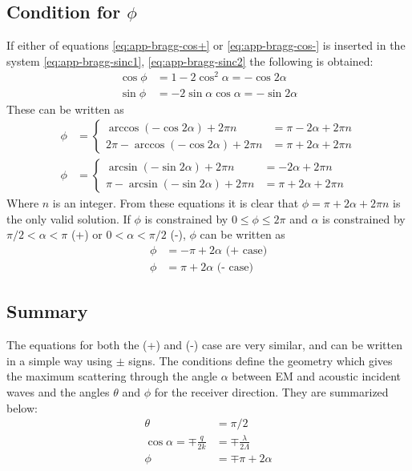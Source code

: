 \documentclass[11pt,twoside]{eitExjobb}
\begin{document}
	\subsection{Condition for $\phi$}
	If either of equations \eqref{eq:app-bragg-cos+} or \eqref{eq:app-bragg-cos-} is inserted in the system \eqref{eq:app-bragg-sinc1}, \eqref{eq:app-bragg-sinc2} the following is obtained:
	\begin{align*}
		\cos{\phi} &= 1 - 2\cos^2{\alpha} = -\cos{2\alpha} \\
		\sin{\phi} &= -2\sin{\alpha}\cos{\alpha} = -\sin{2\alpha}
	\end{align*}
	These can be written as
	\begin{align*}
		\phi &=
		\begin{cases}
			\arccos(-\cos{2\alpha}) + 2\pi n &= \pi - 2\alpha + 2\pi n \\
			2\pi - \arccos(-\cos{2\alpha}) + 2\pi n &= \pi + 2\alpha + 2\pi n
		\end{cases} \\
		\phi &=
		\begin{cases}
			\arcsin(-\sin{2\alpha}) + 2\pi n &= -2\alpha + 2\pi n \\
			\pi - \arcsin(-\sin{2\alpha}) + 2\pi n &= \pi + 2\alpha + 2\pi n
		\end{cases}
	\end{align*}
	Where $n$ is an integer. From these equations it is clear that $\phi = \pi + 2\alpha + 2\pi n$ is the only valid solution. If $\phi$ is constrained by $0 \leq \phi \leq 2\pi$ and $\alpha$ is constrained by $\pi/2 < \alpha < \pi$ (+) or $0 < \alpha < \pi/2$ (-), $\phi$ can be written as
	\begin{align*}
		\phi &= -\pi + 2\alpha \text{ (+ case)}\\
		\phi &= \pi + 2\alpha \text{ (- case)}
	\end{align*}
	
	\subsection{Summary}
	The equations for both the (+) and (-) case are very similar, and can be written in a simple way using $\pm$ signs. The conditions define the geometry which gives the maximum scattering through the angle $\alpha$ between EM and acoustic incident waves and the angles $\theta$ and $\phi$ for the receiver direction. They are summarized below:
	\begin{align}
		\theta &= \pi/2 \label{eq:app-bragg-theta}\\
		\cos{\alpha} = \mp \frac{q}{2k} &= \mp \frac{\lambda}{2\Lambda} \label{eq:app-bragg-alpha}\\
		\phi &= \mp \pi + 2\alpha \label{eq:app-bragg-phi}
	\end{align}
	
\end{document}
